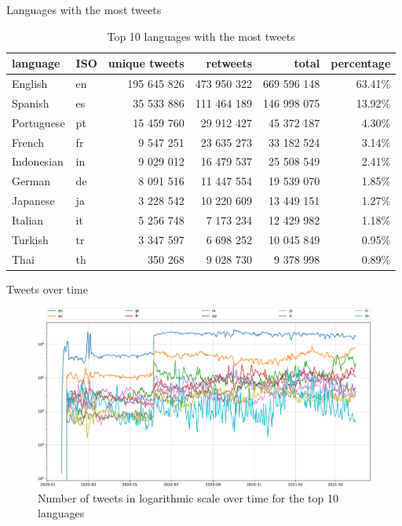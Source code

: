 \documentclass[9pt,aspectratio=1610]{beamer}  %
\begin{document}
\begin{frame}{Languages with the most tweets}
    
    \begin{table}[H]
        \centering
        \begin{tabular}{llrrrr}
        		\bottomrule
        		\textbf{language} & \textbf{ISO} & \textbf{unique tweets} & \textbf{retweets} & \textbf{total} & \textbf{percentage} \\
        		\midrule
            English & en & 195 645 826 & 473 950 322 & 669 596 148 & 63.41\% 
            \\
    		Spanish & es & 35 533 886 & 111 464 189 & 146 998 075 & 13.92\% 
    		\\
    		Portuguese & pt & 15 459 760 & 29 912 427 & 45 372 187 & 4.30\% 
    		\\
    		French & fr & 9 547 251 & 23 635 273 & 33 182 524 & 3.14\% 
    		\\
    		Indonesian & in & 9 029 012 & 16 479 537 & 25 508 549 & 2.41\%
    		\\
    		German & de & 8 091 516 & 11 447 554 & 19 539 070 & 1.85\%
    		\\
    		Japanese & ja & 3 228 542 & 10 220 609 & 13 449 151 & 1.27\%
    		\\
    		Italian & it & 5 256 748 & 7 173 234 & 12 429 982 & 1.18\%
    		\\
    		Turkish & tr & 3 347 597 & 6 698 252 & 10 045 849 & 0.95\%
    		\\
    		Thai & th & 350 268 & 9 028 730 & 9 378 998 & 0.89\%
    		\\
    		\bottomrule
        \end{tabular}
        \caption{Top 10 languages with the most tweets}
        \label{tab:dataset-language-stats}
    \end{table}

\end{frame}

\begin{frame}{Tweets over time}

    \begin{figure}[H]
    	\centering
    	\includegraphics[scale=.30]{assets/img/tweets_per_language_over_time}
    	\caption{Number of tweets in logarithmic scale over time for the top 10 languages}
    	\label{fig:tweets-language-over-time}
    \end{figure}

\end{frame}
\end{document}
